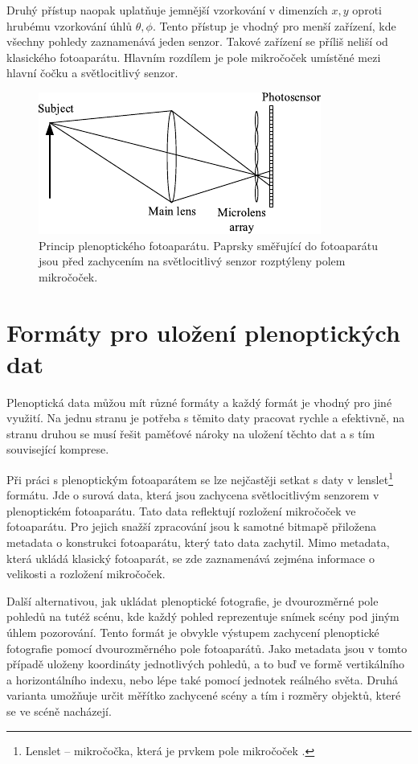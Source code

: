 Druhý přístup naopak uplatňuje jemnější vzorkování v dimenzích $x, y$ oproti hrubému vzorkování úhlů $\theta, \phi$.
Tento přístup je vhodný pro menší zařízení, kde všechny pohledy zaznamenává jeden senzor.
Takové zařízení se příliš neliší od klasického fotoaparátu.
Hlavním rozdílem je pole mikročoček umístěné mezi hlavní čočku a světlocitlivý senzor.

\begin{figure}[h]
	\centering
		\includegraphics[width=.4\textwidth]{obrazky-figures/pleno-cam.pdf}
		\caption{Princip plenoptického fotoaparátu. Paprsky směřující do fotoaparátu jsou před zachycením na světlocitlivý senzor rozptýleny polem mikročoček.}
		\label{plenoPrincip}
\end{figure}

\section{Formáty pro uložení plenoptických dat}
\label{light-field-formats}
Plenoptická data můžou mít různé formáty a každý formát je vhodný pro jiné využití.
Na jednu stranu je potřeba s těmito daty pracovat rychle a efektivně, na stranu druhou se musí řešit paměťové nároky na uložení těchto dat a s tím související komprese.

Při práci s plenoptickým fotoaparátem se lze nejčastěji setkat s daty v lenslet\footnote{Lenslet -- mikročočka, která je prvkem pole mikročoček \cite{lenslet}.} formátu. Jde o surová data, která jsou zachycena světlocitlivým senzorem v plenoptickém fotoaparátu.
Tato data reflektují rozložení mikročoček ve fotoaparátu.
Pro jejich snažší zpracování jsou k samotné bitmapě přiložena metadata o konstrukci fotoaparátu, který tato data zachytil.
Mimo metadata, která ukládá klasický fotoaparát, se zde zaznamenává zejména informace o velikosti a rozložení mikročoček.

Další alternativou, jak ukládat plenoptické fotografie, je dvourozměrné pole pohledů na tutéž scénu, kde každý pohled reprezentuje snímek scény pod jiným úhlem pozorování.
Tento formát je obvykle výstupem zachycení plenoptické fotografie pomocí dvourozměrného pole fotoaparátů.
Jako metadata jsou v tomto případě uloženy koordináty jednotlivých pohledů, a to buď ve formě vertikálního a horizontálního indexu, nebo lépe také pomocí jednotek reálného světa.
Druhá varianta umožňuje určit měřítko zachycené scény a tím i rozměry objektů, které se ve scéně nacházejí.

